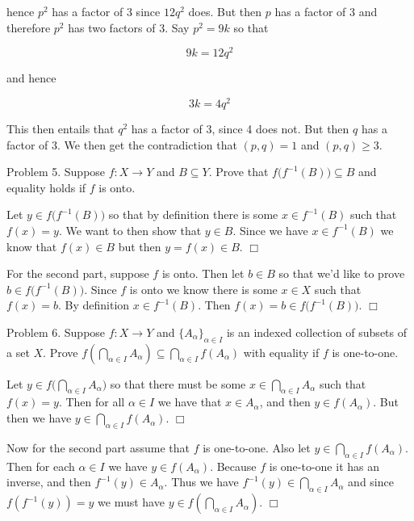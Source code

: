 \documentclass{article}
\begin{document}
hence $p^2$ has a factor of 3 since $12q^2$ does.  But then $p$ has a factor of 3 and therefore $p^2$ has two factors of 3.  Say $p^2 = 9k$ so that

$$ 9k = 12q^2 $$

and hence

$$ 3k = 4q^2 $$

This then entails that $q^2$ has a factor of 3, since 4 does not.  But then $q$ has a factor of 3.  We then get the contradiction that $(p,q)=1$ and $(p,q)\geq 3$.  \Lightning

\pagebreak

{\Large \color{Sepia} Problem 5. Suppose $f:X \rightarrow Y$ and $B\subseteq Y$.  Prove that $f\Big(f^{-1}(B)\Big) \subseteq B$ and equality holds if $f$ is onto.  }

\hspace{1cm}

Let $y\in f\Big(f^{-1}(B)\Big)$ so that by definition there is some $x\in f^{-1}(B)$ such that $f(x) = y$.  We want to then show that $y\in B$.  Since we have $x\in f^{-1}(B)$ we know that $f(x) \in B$ but then $y=f(x)\in B$. $\Box$

\vspace{1cm}

For the second part, suppose $f$ is onto.  Then let $b\in B$ so that we'd like to prove $b\in f\Big(f^{-1}(B)\Big)$.  Since $f$ is onto we know there is some $x\in X$ such that $f(x) = b$.  By definition $x\in f^{-1}(B)$.  Then $f(x)=b\in f\Big(f^{-1}(B)\Big).$ $\Box$

\pagebreak

{\Large \color{Sepia} Problem 6. Suppose $f:X\rightarrow Y$ and $\{A_\alpha\}_{\alpha\in I}$ is an indexed collection of
subsets of a set $X$.  Prove $f\left(\bigcap_{\alpha\in I}A_\alpha\right) \subseteq \bigcap_{\alpha\in I}f(A_\alpha)$
with equality if $f$ is one-to-one.}

\vspace{1cm}

Let $y\in f\Big(\bigcap_{\alpha\in I}A_\alpha\Big)$ so that there must be some $x\in \bigcap_{\alpha\in I}A_\alpha$ such that $f(x) = y$.  Then for all $\alpha\in I$ we have that $x\in A_{\alpha}$, and then $y\in f(A_{\alpha})$.  But then we have $y\in\bigcap_{\alpha\in I}f(A_\alpha)$.  $\Box$

\vspace{1cm}

Now for the second part assume that $f$ is one-to-one.  Also let $y \in \bigcap_{\alpha\in I}f(A_\alpha)$.  Then for each $\alpha\in I$ we have $y\in f(A_\alpha)$.  Because $f$ is one-to-one it has an inverse, and then $f^{-1}(y)\in A_\alpha$.  Thus we have $f^{-1}(y)\in \bigcap_{\alpha\in I}A_\alpha$ and since $f(f^{-1}(y)) = y$ we must have $y\in f(\bigcap_{\alpha\in I}A_\alpha)$.  $\Box$
\end{document}
